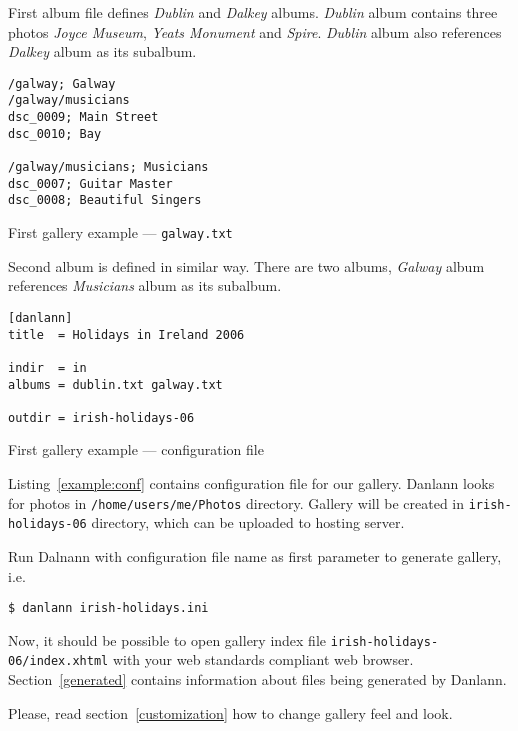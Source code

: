 \documentclass{article}
\begin{document}
First album file defines \textit{Dublin} and \textit{Dalkey} albums.
\textit{Dublin} album contains three photos \textit{Joyce Museum},
\textit{Yeats Monument} and \textit{Spire}. \textit{Dublin} album
also references \textit{Dalkey} album as its subalbum.

\begin{listing}
\begin{lstlisting}
/galway; Galway
/galway/musicians
dsc_0009; Main Street
dsc_0010; Bay

/galway/musicians; Musicians
dsc_0007; Guitar Master
dsc_0008; Beautiful Singers
\end{lstlisting}
\caption{First gallery example --- \texttt{galway.txt}}\label{example:album:galway}
\end{listing}

Second album is defined in similar way. There are two albums, \textit{Galway} album references
\textit{Musicians} album as its subalbum.

\begin{listing}
\begin{lstlisting}
[danlann]
title  = Holidays in Ireland 2006

indir  = in
albums = dublin.txt galway.txt

outdir = irish-holidays-06
\end{lstlisting}
\caption{First gallery example --- configuration file}\label{example:conf}
\end{listing}

Listing~\ref{example:conf} contains configuration file for our gallery.
Danlann looks for photos in \texttt{/home/users/me/Photos} directory.
Gallery will be created in \texttt{irish-holidays-06} directory, which
can be uploaded to hosting server.

Run Dalnann with configuration file name as first parameter to generate
gallery, i.e.
\begin{verbatim}
$ danlann irish-holidays.ini
\end{verbatim}
Now, it should be possible to open gallery index file
\verb$irish-holidays-06/index.xhtml$ with your web standards compliant web
browser. Section~\ref{generated} contains information about files being 
generated by Danlann.

Please, read section~\ref{customization} how to change gallery feel and look.
\end{document}
